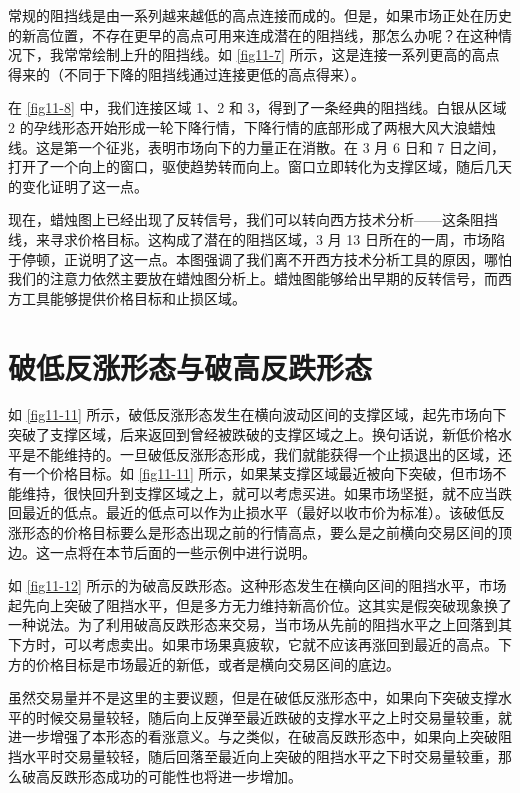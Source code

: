 
常规的阻挡线是由一系列越来越低的高点连接而成的。但是，如果市场正处在历史的新高位置，不存在更早的高点可用来连成潜在的阻挡线，那怎么办呢？在这种情况下，我常常绘制上升的阻挡线。如 \autoref{fig11-7} 所示，这是连接一系列更高的高点得来的（不同于下降的阻挡线通过连接更低的高点得来）。


在 \autoref{fig11-8} 中，我们连接区域 1、2 和 3，得到了一条经典的阻挡线。白银从区域 2 的孕线形态开始形成一轮下降行情，下降行情的底部形成了两根大风大浪蜡烛线。这是第一个征兆，表明市场向下的力量正在消散。在 3 月 6 日和 7 日之间，打开了一个向上的窗口，驱使趋势转而向上。窗口立即转化为支撑区域，随后几天的变化证明了这一点。

现在，蜡烛图上已经出现了反转信号，我们可以转向西方技术分析——这条阻挡线，来寻求价格目标。这构成了潜在的阻挡区域，3 月 13 日所在的一周，市场陷于停顿，正说明了这一点。本图强调了我们离不开西方技术分析工具的原因，哪怕我们的注意力依然主要放在蜡烛图分析上。蜡烛图能够给出早期的反转信号，而西方工具能够提供价格目标和止损区域。


\section{破低反涨形态与破高反跌形态}
如 \autoref{fig11-11} 所示，破低反涨形态发生在横向波动区间的支撑区域，起先市场向下突破了支撑区域，后来返回到曾经被跌破的支撑区域之上。换句话说，新低价格水平是不能维持的。一旦破低反涨形态形成，我们就能获得一个止损退出的区域，还有一个价格目标。如 \autoref{fig11-11} 所示，如果某支撑区域最近被向下突破，但市场不能维持，很快回升到支撑区域之上，就可以考虑买进。如果市场坚挺，就不应当跌回最近的低点。最近的低点可以作为止损水平（最好以收市价为标准）。该破低反涨形态的价格目标要么是形态出现之前的行情高点，要么是之前横向交易区间的顶边。这一点将在本节后面的一些示例中进行说明。


如 \autoref{fig11-12} 所示的为破高反跌形态。这种形态发生在横向区间的阻挡水平，市场起先向上突破了阻挡水平，但是多方无力维持新高价位。这其实是假突破现象换了一种说法。为了利用破高反跌形态来交易，当市场从先前的阻挡水平之上回落到其下方时，可以考虑卖出。如果市场果真疲软，它就不应该再涨回到最近的高点。下方的价格目标是市场最近的新低，或者是横向交易区间的底边。

虽然交易量并不是这里的主要议题，但是在破低反涨形态中，如果向下突破支撑水平的时候交易量较轻，随后向上反弹至最近跌破的支撑水平之上时交易量较重，就进一步增强了本形态的看涨意义。与之类似，在破高反跌形态中，如果向上突破阻挡水平时交易量较轻，随后回落至最近向上突破的阻挡水平之下时交易量较重，那么破高反跌形态成功的可能性也将进一步增加。

